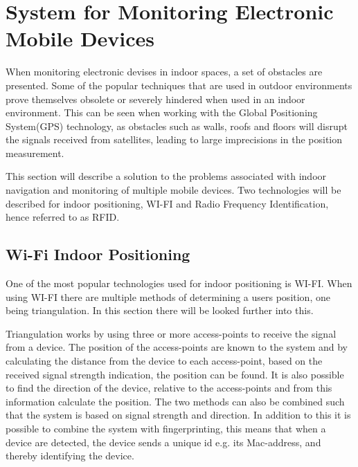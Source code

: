 \section{System for Monitoring Electronic Mobile Devices}\label{sec:monitoring}
When monitoring electronic devises in indoor spaces, a set of obstacles are presented. Some of the popular techniques that are used in outdoor environments prove themselves obsolete or severely hindered when used in an indoor environment.  This can be seen when working with the Global Positioning System(GPS) technology, as obstacles such as walls, roofs and floors will disrupt the signals received from satellites, leading to large imprecisions in the position measurement.

This section will describe a solution to the problems associated with indoor navigation and monitoring of multiple mobile devices.  Two technologies will be described for indoor positioning, WI-FI and Radio Frequency Identification, hence referred to as RFID.  

\subsection{Wi-Fi Indoor Positioning}
One of the most popular technologies used for indoor positioning is WI-FI. When using WI-FI there are multiple methods of determining a users position, one being triangulation. In this section there will be looked further into this. 


Triangulation works by using three or more access-points to receive the signal from a device. The position of the access-points are known to the system and by calculating the distance from the device to each access-point, based on the received signal strength indication, the position can be found. It is also possible to find the direction of the device, relative to the access-points and from this information calculate the position. The two methods can also be combined such that the system is based on signal strength and direction. In addition to this it is possible to combine the system with fingerprinting, this means that when a device are detected, the device sends a unique id e.g. its Mac-address, and thereby identifying the device\cite{triang_n_finger}. %

